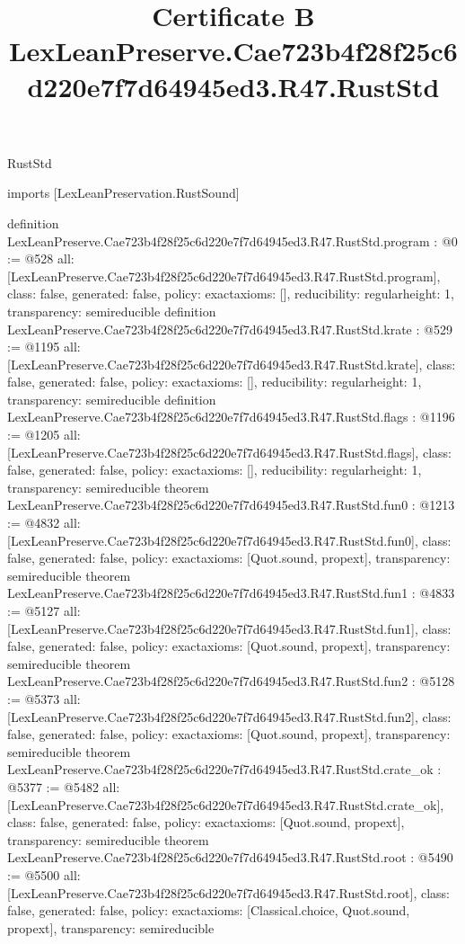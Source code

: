 \begin{lexlean}{RustStd}
\title{Certificate B LexLeanPreserve.Cae723b4f28f25c6d220e7f7d64945ed3.R47.RustStd}
\begin{coremodule}
imports [LexLeanPreservation.RustSound]

definition LexLeanPreserve.Cae723b4f28f25c6d220e7f7d64945ed3.R47.RustStd.program : @0 := @528 {
  all: [LexLeanPreserve.Cae723b4f28f25c6d220e7f7d64945ed3.R47.RustStd.program],
  class: false,
  generated: false,
  policy: exact{axioms: []},
  reducibility: regular{height: 1},
  transparency: semireducible
}
definition LexLeanPreserve.Cae723b4f28f25c6d220e7f7d64945ed3.R47.RustStd.krate : @529 := @1195 {
  all: [LexLeanPreserve.Cae723b4f28f25c6d220e7f7d64945ed3.R47.RustStd.krate],
  class: false,
  generated: false,
  policy: exact{axioms: []},
  reducibility: regular{height: 1},
  transparency: semireducible
}
definition LexLeanPreserve.Cae723b4f28f25c6d220e7f7d64945ed3.R47.RustStd.flags : @1196 := @1205 {
  all: [LexLeanPreserve.Cae723b4f28f25c6d220e7f7d64945ed3.R47.RustStd.flags],
  class: false,
  generated: false,
  policy: exact{axioms: []},
  reducibility: regular{height: 1},
  transparency: semireducible
}
theorem LexLeanPreserve.Cae723b4f28f25c6d220e7f7d64945ed3.R47.RustStd.fun0 : @1213 := @4832 {
  all: [LexLeanPreserve.Cae723b4f28f25c6d220e7f7d64945ed3.R47.RustStd.fun0],
  class: false,
  generated: false,
  policy: exact{axioms: [Quot.sound, propext]},
  transparency: semireducible
}
theorem LexLeanPreserve.Cae723b4f28f25c6d220e7f7d64945ed3.R47.RustStd.fun1 : @4833 := @5127 {
  all: [LexLeanPreserve.Cae723b4f28f25c6d220e7f7d64945ed3.R47.RustStd.fun1],
  class: false,
  generated: false,
  policy: exact{axioms: [Quot.sound, propext]},
  transparency: semireducible
}
theorem LexLeanPreserve.Cae723b4f28f25c6d220e7f7d64945ed3.R47.RustStd.fun2 : @5128 := @5373 {
  all: [LexLeanPreserve.Cae723b4f28f25c6d220e7f7d64945ed3.R47.RustStd.fun2],
  class: false,
  generated: false,
  policy: exact{axioms: [Quot.sound, propext]},
  transparency: semireducible
}
theorem LexLeanPreserve.Cae723b4f28f25c6d220e7f7d64945ed3.R47.RustStd.crate_ok : @5377 := @5482 {
  all: [LexLeanPreserve.Cae723b4f28f25c6d220e7f7d64945ed3.R47.RustStd.crate_ok],
  class: false,
  generated: false,
  policy: exact{axioms: [Quot.sound, propext]},
  transparency: semireducible
}
theorem LexLeanPreserve.Cae723b4f28f25c6d220e7f7d64945ed3.R47.RustStd.root : @5490 := @5500 {
  all: [LexLeanPreserve.Cae723b4f28f25c6d220e7f7d64945ed3.R47.RustStd.root],
  class: false,
  generated: false,
  policy: exact{axioms: [Classical.choice, Quot.sound, propext]},
  transparency: semireducible
}


\end{coremodule}
\end{lexlean}
